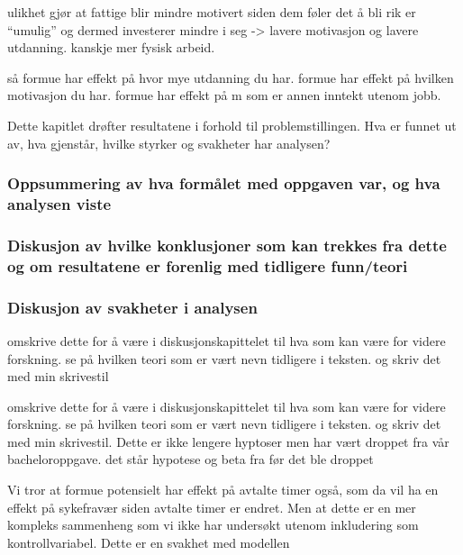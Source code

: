 \documentclass[
  12pt,
  a4paper,
  DIV=11,
  numbers=noendperiod]{scrartcl}
\begin{document}
ulikhet gjør at fattige blir mindre motivert siden dem føler det å bli
rik er ``umulig'' og dermed investerer mindre i seg -\textgreater{}
lavere motivasjon og lavere utdanning. kanskje mer fysisk arbeid.

så formue har effekt på hvor mye utdanning du har. formue har effekt på
hvilken motivasjon du har. formue har effekt på m som er annen inntekt
utenom jobb.

Dette kapitlet drøfter resultatene i forhold til problemstillingen. Hva
er funnet ut av, hva gjenstår, hvilke styrker og svakheter har analysen?

\subsubsection{Oppsummering av hva formålet med oppgaven var, og hva
analysen
viste}\label{oppsummering-av-hva-formuxe5let-med-oppgaven-var-og-hva-analysen-viste}

\subsubsection{Diskusjon av hvilke konklusjoner som kan trekkes fra
dette og om resultatene er forenlig med tidligere
funn/teori}\label{diskusjon-av-hvilke-konklusjoner-som-kan-trekkes-fra-dette-og-om-resultatene-er-forenlig-med-tidligere-funnteori}

\subsubsection{Diskusjon av svakheter i
analysen}\label{diskusjon-av-svakheter-i-analysen}

omskrive dette for å være i diskusjonskapittelet til hva som kan være
for videre forskning. se på hvilken teori som er vært nevn tidligere i
teksten. og skriv det med min skrivestil

omskrive dette for å være i diskusjonskapittelet til hva som kan være
for videre forskning. se på hvilken teori som er vært nevn tidligere i
teksten. og skriv det med min skrivestil. Dette er ikke lengere hyptoser
men har vært droppet fra vår bacheloroppgave. det står hypotese og beta
fra før det ble droppet

Vi tror at formue potensielt har effekt på avtalte timer også, som da
vil ha en effekt på sykefravær siden avtalte timer er endret. Men at
dette er en mer kompleks sammenheng som vi ikke har undersøkt utenom
inkludering som kontrollvariabel. Dette er en svakhet med modellen
\end{document}

